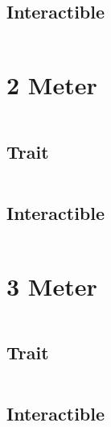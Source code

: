 \documentclass[main.tex]{subfiles}
\begin{document}
\begin{lstlisting}[language=FG]
\end{lstlisting}


\subsection{Interactible}
\begin{lstlisting}[language=FG]

\end{lstlisting}

\section{2 Meter}


\begin{lstlisting}[language=FG]
\end{lstlisting}

\subsection{Trait}

\begin{lstlisting}[language=FG]
\end{lstlisting}


\subsection{Interactible}
\begin{lstlisting}[language=FG]

\end{lstlisting}

\section{3 Meter}


\begin{lstlisting}[language=FG]
\end{lstlisting}

\subsection{Trait}

\begin{lstlisting}[language=FG]
\end{lstlisting}


\subsection{Interactible}
\begin{lstlisting}[language=FG]

\end{lstlisting}
\end{document}
